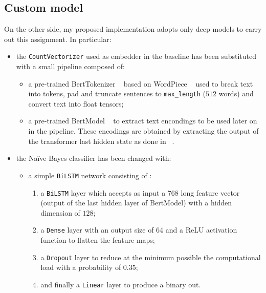 \subsection{Custom model}
\label{subsec:custom}
On the other side, my proposed implementation adopts only deep models to carry out this assignment. In particular:
\begin{itemize}
    \item the \texttt{CountVectorizer} used as embedder in the baseline has been substituted with a small pipeline composed of:

        \begin{itemize}

            \item a pre-trained BertTokenizer ~\cite{tokenizer} based on WordPiece ~\cite{wordpiece} used to break text into tokens, 
                pad and truncate sentences to \texttt{max\_length} ($512$ words) and convert text into float tensors;
            \item a pre-trained BertModel ~\cite{model} to extract text encondings to be used later on in the pipeline. These encodings
                are obtained by extracting the output of the transformer last hidden state as done in ~\cite{mtl}.

        \end{itemize}

    \item the Na\"{i}ve Bayes classifier has been changed with: 
        \begin{itemize}

            \item a simple \texttt{BiLSTM} network consisting of : 
                \begin{enumerate}

                    \item a \texttt{BiLSTM} layer which accepts as input a $768$ long feature vector (output of the last hidden 
                        layer of BertModel) with a hidden dimension of $128$;

                    \item a \texttt{Dense} layer with an output size of $64$ and a ReLU activation function to flatten the feature maps;

                    \item a \texttt{Dropout} layer to reduce at the minimum possible the computational load with a probability of $0.35$;

                    \item and finally a \texttt{Linear} layer to produce a binary out.


\end{enumerate}
\end{itemize}
\end{itemize}

